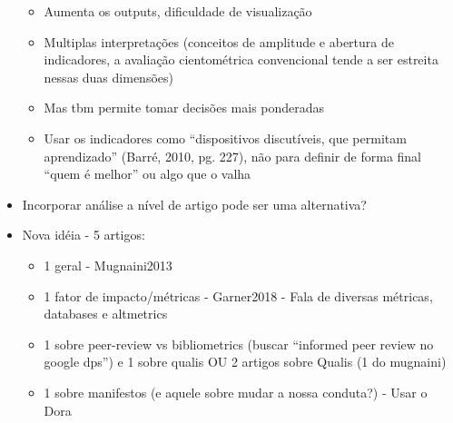 \documentclass[11pt]{article}
\begin{document}
\begin{itemize}
\begin{itemize}
\item Aumenta os outputs, dificuldade de visualização
\item Multiplas interpretações (conceitos de amplitude e abertura de indicadores, a avaliação cientométrica convencional tende a ser estreita nessas duas dimensões)
\item Mas tbm permite tomar decisões mais ponderadas
\item Usar os indicadores como ``dispositivos discutíveis, que permitam aprendizado'' (Barré, 2010, pg. 227), não para definir de forma final ``quem é melhor'' ou algo que o valha
\end{itemize}
\item Incorporar análise a nível de artigo pode ser uma alternativa?
\end{itemize}


\begin{itemize}
\item Nova idéia - 5 artigos:
\begin{itemize}
\item 1 geral - Mugnaini2013
\item 1 fator de impacto/métricas - Garner2018 - Fala de diversas métricas, databases e altmetrics
\item 1 sobre peer-review vs bibliometrics (buscar ``informed peer review no google dps'') e 1 sobre qualis OU 2 artigos sobre Qualis (1 do mugnaini)
\item 1 sobre manifestos (e aquele sobre mudar a nossa conduta?) - Usar o Dora
\end{itemize}
\end{itemize}



\end{document}
